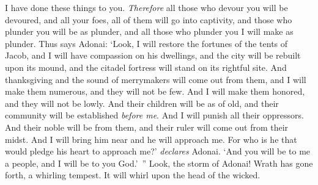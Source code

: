 \begin{biblechapter}
I have done these things to you.
\verse \textit{Therefore} all those who devour you will be devoured, 
and all your foes, all of them will go into captivity, 
and those who plunder you will be as plunder, 
and all those who plunder you I will make as plunder.
\verse Thus says Adonai:
\verse ‘Look, I will restore the fortunes of the tents of Jacob, 
and I will have compassion on his dwellings, 
and the city will be rebuilt upon its mound, 
and the citadel fortress will stand on its rightful site.
\verse And thanksgiving and the sound of merrymakers 
will come out from them, 
and I will make them numerous, 
and they will not be few. 
And I will make them honored, 
and they will not be lowly.
\verse And their children will be as of old, 
and their community will be established \textit{before me}. 
And I will punish all their oppressors.
\verse And their noble will be from them, 
and their ruler will come out from their midst. 
And I will bring him near and he will approach me. 
For who is he that would pledge his heart to approach me?’ \textit{declares} Adonai.
\verse ‘And you will be to me a people, 
and I will be to you God.’ ”
\verse Look, the storm of Adonai! 
Wrath has gone forth, 
a whirling tempest. 
It will whirl upon the head of the wicked.
\end{biblechapter}

